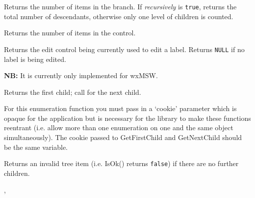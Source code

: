 \label{wxtreectrlgetchildrencount}


Returns the number of items in the branch. If {\it recursively} is {\tt true}, returns the total number
of descendants, otherwise only one level of children is counted.


\label{wxtreectrlgetcount}


Returns the number of items in the control.


\label{wxtreectrlgeteditcontrol}


Returns the edit control being currently used to edit a label. Returns {\tt NULL}
if no label is being edited.

{\bf NB:} It is currently only implemented for wxMSW.


\label{wxtreectrlgetfirstchild}


Returns the first child; call  for the next child.

For this enumeration function you must pass in a `cookie' parameter
which is opaque for the application but is necessary for the library
to make these functions reentrant (i.e. allow more than one
enumeration on one and the same object simultaneously). The cookie passed to
GetFirstChild and GetNextChild should be the same variable.

Returns an invalid tree item (i.e. IsOk() returns {\tt false}) if there are no further children.


,




